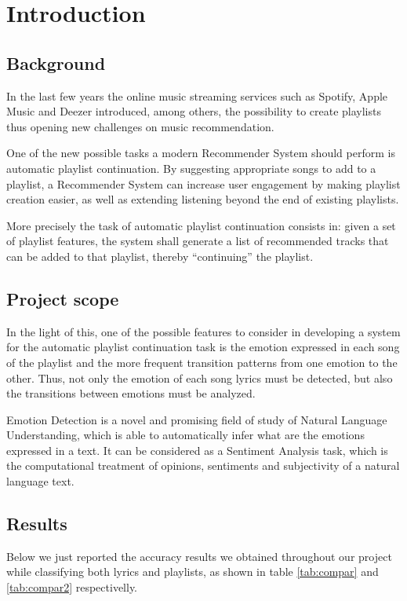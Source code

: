 \chapter{Introduction}
\section{Background}
In the last few years the online music streaming services such as Spotify, Apple Music and Deezer introduced, among others,  the possibility to create playlists thus opening new challenges on music recommendation.\par
One of the new possible tasks a modern Recommender System should perform is automatic playlist continuation. By suggesting appropriate songs to add to a playlist, a Recommender System can increase user engagement by making playlist creation easier, as well as extending listening beyond the end of existing playlists. \par
More precisely the task of automatic playlist continuation consists in: given a set of playlist features, the system shall generate a list of recommended tracks that can be added to that playlist, thereby ``continuing'' the playlist. \par

\section{Project scope}
In the light of this, one of the possible features to consider in developing a system for the automatic playlist continuation task is the emotion expressed in each song of the playlist and the more frequent transition patterns from one emotion to the other. Thus, not only the emotion of each song lyrics must be detected, but also the transitions between emotions must be analyzed. \par
Emotion Detection is a novel and promising field of study of Natural Language Understanding, which is able to automatically infer what are the emotions expressed in a text. It can be considered as a Sentiment Analysis task, which is the computational treatment of opinions, sentiments and subjectivity of a natural language text. \par

\section{Results}

Below we just reported the accuracy results we obtained throughout our project while classifying both lyrics and playlists, as shown in table \ref{tab:compar} and \ref{tab:compar2} respectivelly.

